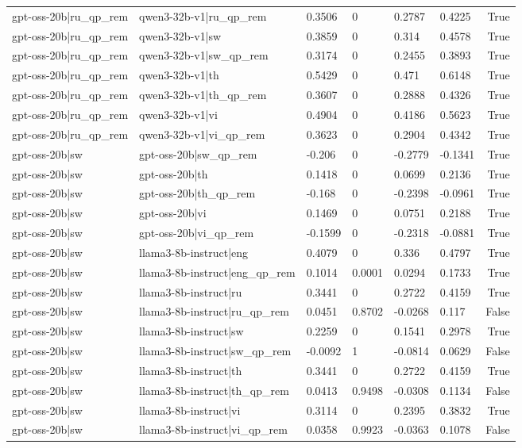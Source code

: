 \begin{table}
\begin{tabular}{llllllr}
gpt-oss-20b|ru_qp_rem & qwen3-32b-v1|ru_qp_rem & 0.3506 & 0 & 0.2787 & 0.4225 & True \\
gpt-oss-20b|ru_qp_rem & qwen3-32b-v1|sw & 0.3859 & 0 & 0.314 & 0.4578 & True \\
gpt-oss-20b|ru_qp_rem & qwen3-32b-v1|sw_qp_rem & 0.3174 & 0 & 0.2455 & 0.3893 & True \\
gpt-oss-20b|ru_qp_rem & qwen3-32b-v1|th & 0.5429 & 0 & 0.471 & 0.6148 & True \\
gpt-oss-20b|ru_qp_rem & qwen3-32b-v1|th_qp_rem & 0.3607 & 0 & 0.2888 & 0.4326 & True \\
gpt-oss-20b|ru_qp_rem & qwen3-32b-v1|vi & 0.4904 & 0 & 0.4186 & 0.5623 & True \\
gpt-oss-20b|ru_qp_rem & qwen3-32b-v1|vi_qp_rem & 0.3623 & 0 & 0.2904 & 0.4342 & True \\
gpt-oss-20b|sw & gpt-oss-20b|sw_qp_rem & -0.206 & 0 & -0.2779 & -0.1341 & True \\
gpt-oss-20b|sw & gpt-oss-20b|th & 0.1418 & 0 & 0.0699 & 0.2136 & True \\
gpt-oss-20b|sw & gpt-oss-20b|th_qp_rem & -0.168 & 0 & -0.2398 & -0.0961 & True \\
gpt-oss-20b|sw & gpt-oss-20b|vi & 0.1469 & 0 & 0.0751 & 0.2188 & True \\
gpt-oss-20b|sw & gpt-oss-20b|vi_qp_rem & -0.1599 & 0 & -0.2318 & -0.0881 & True \\
gpt-oss-20b|sw & llama3-8b-instruct|eng & 0.4079 & 0 & 0.336 & 0.4797 & True \\
gpt-oss-20b|sw & llama3-8b-instruct|eng_qp_rem & 0.1014 & 0.0001 & 0.0294 & 0.1733 & True \\
gpt-oss-20b|sw & llama3-8b-instruct|ru & 0.3441 & 0 & 0.2722 & 0.4159 & True \\
gpt-oss-20b|sw & llama3-8b-instruct|ru_qp_rem & 0.0451 & 0.8702 & -0.0268 & 0.117 & False \\
gpt-oss-20b|sw & llama3-8b-instruct|sw & 0.2259 & 0 & 0.1541 & 0.2978 & True \\
gpt-oss-20b|sw & llama3-8b-instruct|sw_qp_rem & -0.0092 & 1 & -0.0814 & 0.0629 & False \\
gpt-oss-20b|sw & llama3-8b-instruct|th & 0.3441 & 0 & 0.2722 & 0.4159 & True \\
gpt-oss-20b|sw & llama3-8b-instruct|th_qp_rem & 0.0413 & 0.9498 & -0.0308 & 0.1134 & False \\
gpt-oss-20b|sw & llama3-8b-instruct|vi & 0.3114 & 0 & 0.2395 & 0.3832 & True \\
gpt-oss-20b|sw & llama3-8b-instruct|vi_qp_rem & 0.0358 & 0.9923 & -0.0363 & 0.1078 & False \\

\end{tabular}
\end{table}
